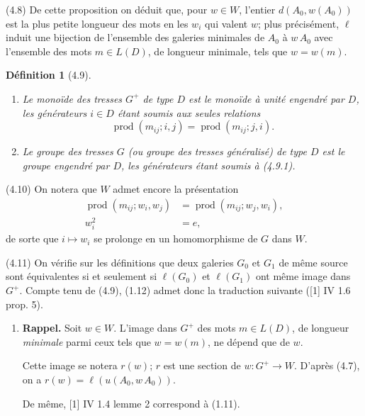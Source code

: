 \documentclass[12pt]{article}
\newtheorem{definition}[theoreme]{Définition}
\theoremstyle{remark}
\begin{document}
(4.8) De cette proposition on déduit que, pour $w \in W$, l'entier $d(A_0, w(A_0))$ est la plus petite longueur des mots en les $w_i$ qui valent $w$; plus précisément, $\ell$ induit une bijection de l'ensemble des galeries minimales de $A_0$ à $w \, A_0$ avec l'ensemble des mots $m \in L(D)$, de longueur minimale, tels que $w = w(m)$.

\begin{definition}[4.9]
\begin{enumerate}
\item[(i)] Le \emph{monoïde des tresses} $G^+$ de \emph{type} $D$ est le monoïde à unité engendré par $D$, les générateurs $i \in D$ étant soumis aux seules relations
\begin{equation}
\operatorname{prod}(m_{ij}; i, j) = \operatorname{prod}(m_{ij}; j, i).\tag{4.9.1}
\end{equation}
\item[(ii)] Le \emph{groupe des tresses} $G$ (ou \emph{groupe des tresses généralisé}) de type $D$ est le groupe engendré par $D$, les générateurs étant soumis à (4.9.1).
\end{enumerate}
\end{definition}

(4.10) On notera que $W$ admet encore la présentation
\begin{align}
\operatorname{prod}(m_{ij}; w_i, w_j) &= \operatorname{prod}(m_{ij}; w_j, w_i), \tag{4.10.1} \\
w_i^2 &= e, \tag{4.10.2}
\end{align}
de sorte que $i \mapsto w_i$ se prolonge en un homomorphisme de $G$ dans $W$.

(4.11) On vérifie sur les définitions que deux galeries $G_0$ et $G_1$ de même source sont équivalentes si et seulement si $\ell(G_0)$ et $\ell(G_1)$ ont même image dans $G^+$. Compte tenu de (4.9), (1.12) admet donc la traduction suivante ([1] IV 1.6 prop. 5).

\begin{enumerate}
\item[(4.12)] \textbf{Rappel.} Soit $w \in W$. L'image dans $G^+$ des mots $m \in L(D)$, de longueur \emph{minimale} parmi ceux tels que $w = w(m)$, ne dépend que de $w$.

Cette image se notera $r(w)$; $r$ est une section de $w \colon G^+ \to W$. D'après (4.7), on a $r(w) = \ell(u(A_0, w \, A_0))$.

De même, [1] IV 1.4 lemme 2 correspond à (1.11).
\end{enumerate}
\end{document}
